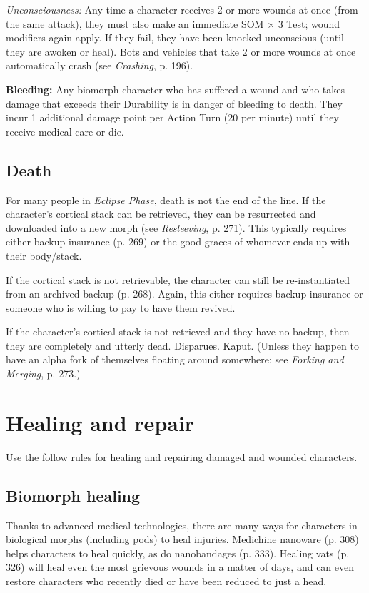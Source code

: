 \emph{Unconsciousness:} Any time a character receives 2 or more wounds at once (from the same attack), they must also make an immediate SOM $\times$ 3 Test; wound modifiers again apply. If they fail, they have been knocked unconscious (until they are awoken or heal). Bots and vehicles that take 2 or more wounds at once automatically crash (see \emph{Crashing}, p. 196). 

\textbf{Bleeding:} Any biomorph character who has suffered a wound and who takes damage that exceeds their Durability is in danger of bleeding to death. They incur 1 additional damage point per Action Turn (20 per minute) until they receive medical care or die. 

\subsection{Death} For many people in \emph{Eclipse Phase}, death is not the end of the line. If the character’s cortical stack can be retrieved, they can be resurrected and downloaded into a new morph (see \emph{Resleeving}, p. 271). This typically requires either backup insurance (p. 269) or the good graces of whomever ends up with their body/stack. 

If the cortical stack is not retrievable, the character can still be re-instantiated from an archived backup (p. 268). Again, this either requires backup insurance or someone who is willing to pay to have them revived. 

If the character’s cortical stack is not retrieved and they have no backup, then they are completely and utterly dead. Disparues. Kaput. (Unless they happen to have an alpha fork of themselves floating around somewhere; see \emph{Forking and Merging}, p. 273.) 



\section{Healing and repair} \label{sec:healing-repair} 

Use the follow rules for healing and repairing damaged and wounded characters. 

\subsection{Biomorph healing} 

Thanks to advanced medical technologies, there are many ways for characters in biological morphs (including pods) to heal injuries. Medichine nanoware (p. 308) helps characters to heal quickly, as do nanobandages (p. 333). Healing vats (p. 326) will heal even the most grievous wounds in a matter of days, and can even restore characters who recently died or have been reduced to just a head. 

